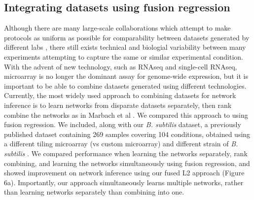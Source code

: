 \documentclass[11pt]{article}
\begin{document}
\subsection{Integrating datasets using fusion regression}
Although there are many large-scale collaborations which attempt to make protocols as uniform as possible for comparability between datasets generated by different labs \cite{paten_nih_2015,kundaje_integrative_2015}, there still exists technical and biologial variability between many experiments attempting to capture the same or similar experimental condition. With the advent of new technology, such as RNAseq and single-cell RNAseq, microarray is no longer the dominant assay for genome-wide expression, but it is important to be able to combine datasets generated using different technologies. Currently, the most widely used approach to combining datasets for network inference is to learn networks from disparate datasets separately, then rank combine the networks as in Marbach et al \cite{marbach_revealing_2010}. We compared this approach to using fusion regression. We included, along with our \textit{B. subtilis} dataset, a previously published dataset containing 269 samples covering 104 conditions, obtained using a different tiling microarray (vs custom microarray) and different strain of \textit{B. subtilis} \cite{nicolas2012condition}. We compared performance when learning the networks separately, rank combining, and learning the networks simultaneously using fusion regression, and showed improvement on network inference using our fused L2 approach (Figure 6a). Importantly, our approach simultaneously learns multiple networks, rather than learning networks separately than combining into one. 
\end{document}
